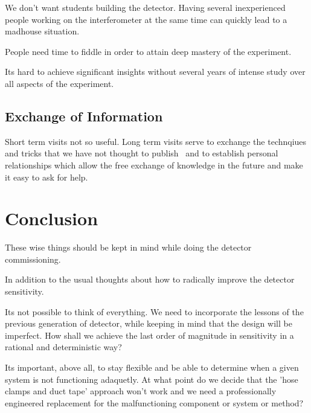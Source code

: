 We don't want students building the detector. Having several inexperienced people
working on the interferometer at the same time can quickly lead to a madhouse
situation.

People need time to fiddle in order to attain deep mastery of the experiment.

Its hard to achieve significant insights without several years of intense
study over all aspects of the experiment.

\subsection{Exchange of Information}
Short term visits not so useful. Long term visits serve to exchange the
technqiues and tricks that we have not thought to publish~\cite{HarryCollins}
and to establish personal relationships which allow the free exchange of
knowledge in the future and make it easy to ask for help.


\section{Conclusion}
These wise things should be kept in mind while doing the detector commissioning.

In addition to the usual thoughts about how to radically improve the detector sensitivity.

Its not possible to think of everything. We need to incorporate the lessons of
the previous generation of detector, while keeping in mind that the design will
be imperfect. How shall we achieve the last order of magnitude in sensitivity
in a rational and deterministic way?

Its important, above all, to stay flexible
and be able to determine when a given system is not functioning adaquetly. At
what point do we decide that the 'hose clamps and duct tape' approach won't
work and we need a professionally engineered replacement for the
malfunctioning component or system or method?
